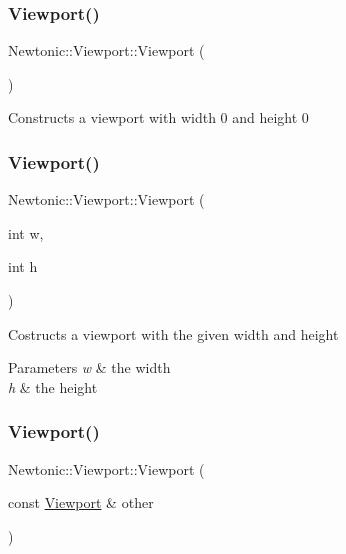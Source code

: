 \subsubsection{\texorpdfstring{Viewport()}{Viewport()}\hspace{0.1cm}{\footnotesize\ttfamily [1/3]}}
{\footnotesize\ttfamily Newtonic\+::\+Viewport\+::\+Viewport (\begin{DoxyParamCaption}{ }\end{DoxyParamCaption})\hspace{0.3cm}{\ttfamily [inline]}}

Constructs a viewport with width 0 and height 0 \mbox{\label{structNewtonic_1_1Viewport_ad1eff9e8c599b3e192fc3830bb2166db}} 
\subsubsection{\texorpdfstring{Viewport()}{Viewport()}\hspace{0.1cm}{\footnotesize\ttfamily [2/3]}}
{\footnotesize\ttfamily Newtonic\+::\+Viewport\+::\+Viewport (\begin{DoxyParamCaption}\item[{int}]{w,  }\item[{int}]{h }\end{DoxyParamCaption})\hspace{0.3cm}{\ttfamily [inline]}}

Costructs a viewport with the given width and height 
\begin{DoxyParams}{Parameters}
{\em w} & the width \\
\hline
{\em h} & the height \\
\hline
\end{DoxyParams}
\mbox{\label{structNewtonic_1_1Viewport_a71ca24cb5e0a27abfb87f9d3ec4c0acd}} 
\subsubsection{\texorpdfstring{Viewport()}{Viewport()}\hspace{0.1cm}{\footnotesize\ttfamily [3/3]}}
{\footnotesize\ttfamily Newtonic\+::\+Viewport\+::\+Viewport (\begin{DoxyParamCaption}\item[{const \mbox{\hyperlink{structNewtonic_1_1Viewport}{Viewport}} \&}]{other }\end{DoxyParamCaption})\hspace{0.3cm}{\ttfamily [inline]}}

